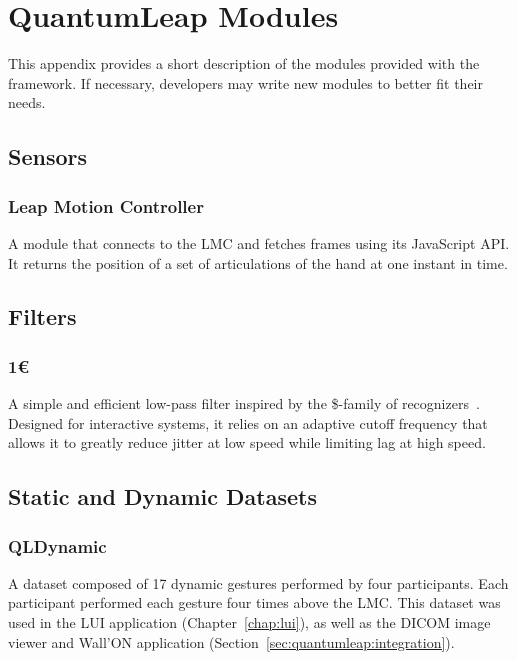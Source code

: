 \chapter{QuantumLeap Modules} \label{app:quantumleap-modules}
This appendix provides a short description of the modules provided with the \ql framework. If necessary, developers may write new modules to better fit their needs.

\section{Sensors} \label{app:quantumleap-modules:sensors}
\subsection{Leap Motion Controller}
A module that connects to the LMC and fetches frames using its JavaScript API. It returns the position of a set of articulations of the hand at one instant in time.

\section{Filters} \label{app:quantumleap-modules:filters}
\subsection{1\euro}
A simple and efficient low-pass filter inspired by the \$-family of recognizers~\cite{Casiez:2012}. Designed for interactive systems, it relies on an adaptive cutoff frequency that allows it to greatly reduce jitter at low speed while limiting lag at high speed.

\section{Static and Dynamic Datasets} \label{app:quantumleap-modules:datasets}
\subsection{QLDynamic} 
A dataset composed of 17 dynamic gestures performed by four participants. Each participant performed each gesture four times above the LMC. This dataset was used in the LUI application (Chapter~\ref{chap:lui}), as well as the DICOM image viewer and Wall'ON application (Section~\ref{sec:quantumleap:integration}).
